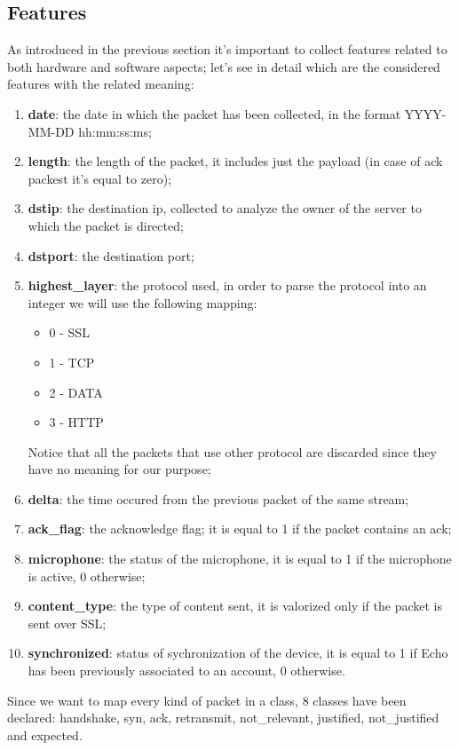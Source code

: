 \documentclass[sigconf]{acmart}
\begin{document}
    \subsection{Features}
    As introduced in the previous section it's important to collect features related to both hardware and software aspects; let's see in detail which are the considered features with the related meaning:
    \begin{enumerate}
        \item \textbf{date}: the date in which the packet has been collected, in the format YYYY-MM-DD hh:mm:ss:ms;
        \item \textbf{length}: the length of the packet, it includes just the payload (in case of ack packest it's equal to zero);
        \item \textbf{dstip}: the destination ip, collected to analyze the owner of the server to which the packet is directed;
        \item \textbf{dstport}: the destination port;
        \item \textbf{highest\_layer}: the protocol used, in order to parse the protocol into an integer we will use the following mapping:
        \begin{itemize}
            \item 0 - SSL
            \item 1 - TCP
            \item 2 - DATA
            \item 3 - HTTP
        \end{itemize}
        Notice that all the packets that use other protocol are discarded since they have no meaning for our purpose;
        \item \textbf{delta}: the time occured from the previous packet of the same stream;
        \item \textbf{ack\_flag}: the acknowledge flag; it is equal to 1 if the packet contains an ack;
        \item \textbf{microphone}: the status of the microphone, it is equal to 1 if the microphone is active, 0 otherwise;
        \item \textbf{content\_type}: the type of content sent, it is valorized only if the packet is sent over SSL;
        \item \textbf{synchronized}: status of sychronization of the device, it is equal to 1 if Echo has been previously associated to an account, 0 otherwise.
    \end{enumerate}
    Since we want to map every kind of packet in a class, 8 classes have been declared: handshake, syn, ack, retransmit, not\_relevant, justified, not\_justified and expected.
\end{document}
